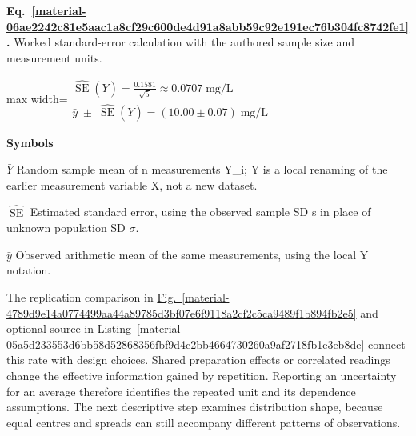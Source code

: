 \documentclass[11pt,a4paper]{article}
\begin{document}
\par\medskip
\begin{samepage}
\label{material-06ae2242c81e5aac1a8cf29c600de4d91a8abb59c92e191ec76b304fc8742fe1}
\noindent\textbf{Eq.~\ref*{material-06ae2242c81e5aac1a8cf29c600de4d91a8abb59c92e191ec76b304fc8742fe1}.} Worked standard-error calculation with the authored sample size and measurement units.\par\nopagebreak
\begin{center}\begin{adjustbox}{max width=\linewidth}$\displaystyle \begin{gathered}\widehat{\operatorname{SE}}(\bar Y)=\frac{0.1581}{\sqrt5}\approx0.0707\;\mathrm{mg/L}\\\boxed{\bar y\;\pm\;\widehat{\operatorname{SE}}(\bar Y)=(10.00\pm0.07)\;\mathrm{mg/L}}\end{gathered}$\end{adjustbox}\end{center}

\par\noindent\textbf{Symbols}

\par\noindent\textbf{\(\bar Y\)} Random sample mean of n measurements Y\_i; Y is a local renaming of the earlier measurement variable X, not a new dataset.

\par\noindent\textbf{\(\widehat{\operatorname{SE}}\)} Estimated standard error, using the observed sample SD s in place of unknown population SD \ensuremath{\sigma}.

\par\noindent\textbf{\(\bar y\)} Observed arithmetic mean of the same measurements, using the local Y notation.

\end{samepage}
\medskip

The replication comparison in \hyperref[material-4789d9e14a0774499aa44a89785d3bf07e6f9118a2cf2c5ca9489f1b894fb2e5]{Fig.~\ref*{material-4789d9e14a0774499aa44a89785d3bf07e6f9118a2cf2c5ca9489f1b894fb2e5}} and optional source in \hyperref[material-05a5d233553d6bb58d52868356fbf9d4c2bb4664730260a9af2718fb1e3eb8de]{Listing~\ref*{material-05a5d233553d6bb58d52868356fbf9d4c2bb4664730260a9af2718fb1e3eb8de}} connect this rate with design choices. Shared preparation effects or correlated readings change the effective information gained by repetition. Reporting an uncertainty for an average therefore identifies the repeated unit and its dependence assumptions. The next descriptive step examines distribution shape, because equal centres and spreads can still accompany different patterns of observations.
\end{document}
